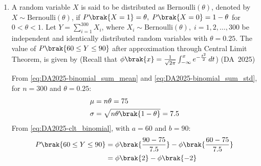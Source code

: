 \begin{enumerate}[label=\thesubsection.\arabic*, ref=\thesubsection.\theenumi]
	\item 
	A random variable $X$ is said to be distributed as $\text{Bernoulli}(\theta)$, denoted by $X \sim \text{Bernoulli}(\theta)$, if $P\brak{X = 1} = \theta, \; P\brak{X = 0} = 1 - \theta$ for $0 < \theta < 1$. Let $Y = \sum_{i=1}^{300} X_i$, where $X_i \sim \text{Bernoulli}(\theta), \; i = 1, 2, \dots, 300$ be independent and identically distributed random variables with $\theta = 0.25$. The value of $P\brak{60 \le Y \le 90}$ after approximation through Central Limit Theorem, is given by (Recall that $\phi\brak{x} = \frac{1}{\sqrt{2\pi}}\int_{-\infty}^x e^{-\frac{t^2}{2}}\,dt$)
	\hfill (DA~2025)
	\begin{enumerate}
	\end{enumerate}
	\solution
	From \eqref{eq:DA2025-binomial_sum_mean} and \eqref{eq:DA2025-binomial_sum_std}, for $n = 300$ and $\theta = 0.25$:
	\begin{align}
		\mu &= n\theta = 75
		\\
		\sigma &= \sqrt{n\theta\brak{1-\theta}} = 7.5
	\end{align}
	From \eqref{eq:DA2025-clt_binomial}, with $a = 60$ and $b = 90$:
	\begin{align}
		P\brak{60 \le Y \le 90} &= \phi\brak{\frac{90 - 75}{7.5}} - \phi\brak{\frac{60 - 75}{7.5}}
		\\
		&= \phi\brak{2} - \phi\brak{-2}
	\end{align}
	

\end{enumerate}
